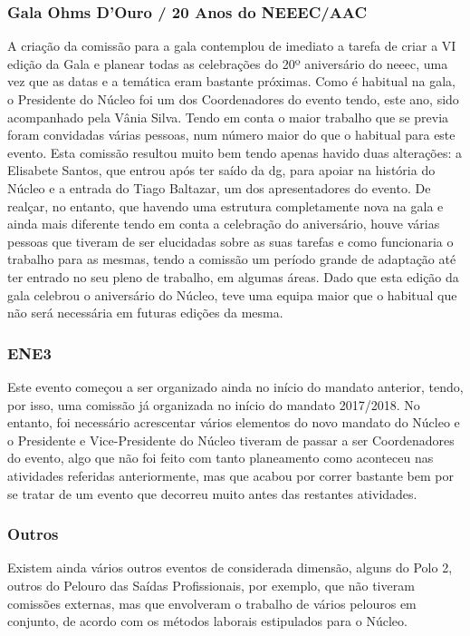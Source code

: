 \subsubsection{Gala Ohms D'Ouro / 20 Anos do NEEEC/AAC}

A criação da comissão para a gala contemplou de imediato a tarefa de criar a VI edição da Gala e planear todas as celebrações do 20º aniversário do \acrshort{neeec}, uma vez que as datas e a temática eram bastante próximas. Como é habitual na gala, o Presidente do Núcleo foi um dos Coordenadores do evento tendo, este ano, sido acompanhado pela Vânia Silva. Tendo em conta o maior trabalho que se previa foram convidadas várias pessoas, num número maior do que o habitual para este evento. Esta comissão resultou muito bem tendo apenas havido duas alterações: a Elisabete Santos, que entrou após ter saído da \acrshort{dg}, para apoiar na história do Núcleo e a entrada do Tiago Baltazar, um dos apresentadores do evento. De realçar, no entanto, que havendo uma estrutura completamente nova na gala e ainda mais diferente tendo em conta a celebração do aniversário, houve várias pessoas que tiveram de ser elucidadas sobre as suas tarefas e como funcionaria o trabalho para as mesmas, tendo a comissão um período grande de adaptação até ter entrado no seu pleno de trabalho, em algumas áreas. Dado que esta edição da gala celebrou o aniversário do Núcleo, teve uma equipa maior que o habitual que não será necessária em futuras edições da mesma.

\subsubsection{ENE3}

Este evento começou a ser organizado ainda no início do mandato anterior, tendo, por isso, uma comissão já organizada no início do mandato 2017/2018. No entanto, foi necessário acrescentar vários elementos do novo mandato do Núcleo e o Presidente e Vice-Presidente do Núcleo tiveram de passar a ser Coordenadores do evento, algo que não foi feito com tanto planeamento como aconteceu nas atividades referidas anteriormente, mas que acabou por correr bastante bem por se tratar de um evento que decorreu muito antes das restantes atividades.

\subsubsection{Outros}

Existem ainda vários outros eventos de considerada dimensão, alguns do Polo 2, outros do Pelouro das Saídas Profissionais, por exemplo, que não tiveram comissões externas, mas que envolveram o trabalho de vários pelouros em conjunto, de acordo com os métodos laborais estipulados para o Núcleo.
